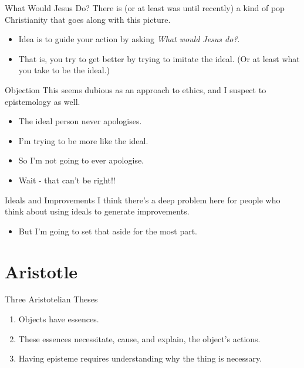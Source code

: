\documentclass[
  17pt,
  letterpaper,
  ignorenonframetext,
  aspectratio=169,
  handout]{beamer}
\providecommand{\tightlist}{%
  \setlength{\itemsep}{0pt}\setlength{\parskip}{0pt}}\usepackage{longtable,booktabs,array}
\begin{document}
\begin{frame}{What Would Jesus Do?}
\protect\hypertarget{what-would-jesus-do}{}
There is (or at least was until recently) a kind of pop Christianity
that goes along with this picture.

\begin{itemize}[<+->]
\tightlist
\item
  Idea is to guide your action by asking \emph{What would Jesus do?}.
\item
  That is, you try to get better by trying to imitate the ideal. (Or at
  least what you take to be the ideal.)
\end{itemize}
\end{frame}

\begin{frame}{Objection}
\protect\hypertarget{objection}{}
This seems dubious as an approach to ethics, and I suspect to
epistemology as well.

\begin{itemize}[<+->]
\tightlist
\item
  The ideal person never apologises.
\item
  I'm trying to be more like the ideal.
\item
  So I'm not going to ever apologise.
\item
  Wait - that can't be right!!
\end{itemize}
\end{frame}

\begin{frame}{Ideals and Improvements}
\protect\hypertarget{ideals-and-improvements-1}{}
I think there's a deep problem here for people who think about using
ideals to generate improvements.

\begin{itemize}[<+->]
\tightlist
\item
  But I'm going to set that aside for the most part.
\end{itemize}
\end{frame}

\hypertarget{aristotle}{%
\section{Aristotle}\label{aristotle}}

\begin{frame}{Three Aristotelian Theses}
\protect\hypertarget{three-aristotelian-theses}{}
\begin{enumerate}[<+->]
\tightlist
\item
  Objects have essences.
\item
  These essences necessitate, cause, and explain, the object's actions.
\item
  Having episteme requires understanding why the thing is necessary.
\end{enumerate}
\end{frame}
\end{document}
